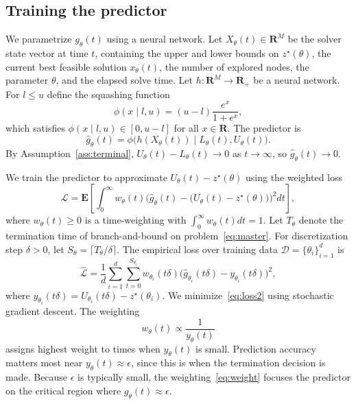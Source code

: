 \documentclass[12pt]{article}
\theoremstyle{definition}
\theoremstyle{remark}
\newcommand{\param}{\theta}
\newcommand{\reals}{\mathbf{R}}
\newcommand{\UB}{U}
\newcommand{\LB}{L}
\newcommand{\ov}{z^\star}
\newcommand{\covars}{X}
\newcommand{\nn}{h}
\newcommand{\activ}{\phi}
\newcommand{\loss}{\mathcal{L}}
\newcommand{\E}{\mathbf{E}}
\newcommand{\vars}{x}
\newcommand{\truegap}{g}
\newcommand{\predgap}{\hat{g}}
\newcommand{\tol}{\epsilon}
\newcommand{\weight}{w}
\newcommand{\train}{\mathcal{D}}
\newcommand{\ntrain}{d}
\newcommand{\param}{\theta}
\newcommand{\reals}{\mathbf{R}}
\newcommand{\UB}{U}
\newcommand{\LB}{L}
\newcommand{\ov}{z^\star}
\newcommand{\covars}{X}
\newcommand{\nn}{h}
\newcommand{\activ}{\phi}
\newcommand{\loss}{\mathcal{L}}
\newcommand{\E}{\mathbf{E}}
\newcommand{\vars}{x}
\newcommand{\truegap}{g}
\newcommand{\predgap}{\hat{g}}
\newcommand{\tol}{\epsilon}
\newcommand{\weight}{w}
\newcommand{\train}{\mathcal{D}}
\newcommand{\ntrain}{d}
\theoremstyle{plain}
\theoremstyle{definition}
\theoremstyle{remark}
\begin{document}
\subsection{Training the predictor} \label{sec:training}
We parametrize $\truegap_\param(t)$ using a neural network.
Let $\covars_\param(t) \in \reals^M$ be the solver state vector at time $t$, containing the upper and lower bounds on $\ov(\param)$, the current best feasible solution $\vars_\param(t)$, the number of explored nodes, the parameter $\param$, and the elapsed solve time.
Let $\nn: \reals^M \rightarrow \reals_+$ be a neural network.
For $l \le u$ define the squashing function
\begin{equation}
    \activ(x \mid l, u) = (u - l)\frac{e^x}{1 + e^x},
\end{equation}
which satisfies $\activ(x \mid l, u) \in [0, u-l]$ for all $x \in \reals$.
The predictor is
\begin{equation*}
\predgap_\param(t) = \activ\big(\nn(\covars_\param(t)) \mid \LB_\param(t), \UB_\param(t)\big).
\end{equation*}
By Assumption~\ref{ass:terminal}, $\UB_\param(t) - \LB_\param(t) \to 0$ as $t \to \infty$, so $\predgap_\param(t) \to 0$.

We train the predictor to approximate $\UB_\param(t) - \ov(\param)$ using the weighted loss
\begin{equation*}
    \loss = \E\left[ \int_0^\infty \weight_{\param}(t) \Big(\predgap_\param(t) - \big(\UB_\param(t) - \ov(\param)\big)\Big)^2 dt\right],
\end{equation*}
where $\weight_\param(t) \ge 0$ is a time-weighting with $\int_0^\infty \weight_{\param}(t) dt = 1$.
Let $T_\param$ denote the termination time of branch-and-bound on problem~\eqref{eq:master}.
For discretization step $\delta > 0$, let $S_\param = \lceil T_\param / \delta \rceil$.
The empirical loss over training data $\train = \{\param_i\}_{i=1}^\ntrain$ is
\begin{equation} \label{eq:loss2}
    \hat{\loss} = \frac{1}{\ntrain} \sum_{i=1}^\ntrain \sum_{t=0}^{S_{\param_i}} \weight_{\param_i}(t \delta) \Big(\predgap_{\param_i}(t \delta) - y_{\param_i}(t \delta)\Big)^2,
\end{equation}
where $y_{\param_i}(t \delta) = \UB_{\param_i}(t \delta) - \ov({\param_i})$.
We minimize~\eqref{eq:loss2} using stochastic gradient descent.
The weighting
\begin{equation}
    \weight_{\param}(t) \propto \frac{1}{y_{\param}(t)} \label{eq:weight}
\end{equation}
assigns highest weight to times when $y_{\param}(t)$ is small.
Prediction accuracy matters most near $y_{\param}(t) \approx \tol$, since this is when the termination decision is made.
Because $\tol$ is typically small, the weighting~\eqref{eq:weight} focuses the predictor on the critical region where $\truegap_{\param}(t) \approx \tol$.
\end{document}
